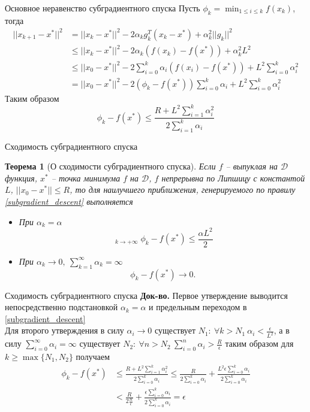 \documentclass[10pt, handout]{beamer}
\DeclareMathOperator*\uplim{\overline{lim}}
\newtheorem{theorem_ru}{Теорема}[]
\begin{document}
\begin{frame}{Основное неравенство субградиентного спуска}
Пусть $\phi_k=\min_{1\leq i\leq k}f(x_k)$, тогда
\begin{align*} 
||x_{k+1}-x^*||^2&=||x_k-x^*||^2-2\alpha_kg^T_k(x_k-x^*)+\alpha_k^2||g_k||^2\\
&\leq||x_k-x^*||^2-2\alpha_k(f(x_k)-f(x^*))+\alpha_k^2L^2\\
&\leq ||x_0-x^*||^2-2\sum_{i=0}^k\alpha_i(f(x_i)-f(x^*))+L^2\sum_{i=0}^k\alpha_i^2\\
&=||x_0-x^*||^2-2(\phi_k-f(x^*))\sum_{i=0}^k\alpha_i+L^2\sum_{i=0}^k\alpha_i^2
\end{align*}
Таким образом
\begin{equation}\label{lower_linear_model}
\phi_k-f(x^*)\leq \frac{R+L^2\sum_{i=1}^k\alpha_i^2}{2\sum_{i=1}^k\alpha_i}
\end{equation}
\end{frame}

\begin{frame}{Сходимость субградиентного спуска}
\begin{theorem_ru}[О сходимости субградиентного спуска]
Если $f$ -- выпуклая на $\mathcal{D}$ функция, $x^*$ -- точка минимума $f$ на $\mathcal{D}$, $f$ непрерывна по Липшицу с константой $L$, $||x_0-x^*||\leq R$, то для наилучшего приближения, генерируемого по правилу \eqref{subgradient_descent} выполняется
\begin{itemize}
\item При $\alpha_k=\alpha$
$$
\uplim_{k\rightarrow +\infty}\phi_k-f(x^*)\leq \frac{\alpha L^2}{2}
$$
\item При $\alpha_k\rightarrow 0,~\sum_{k=1}^\infty \alpha_k=\infty$
$$
\phi_k-f(x^*)\rightarrow 0.
$$
\end{itemize}
\end{theorem_ru}

\end{frame}

\begin{frame}{Сходимость субградиентного спуска}
\textbf{Док-во.} Первое утверждение выводится непосредственно подстановкой $\alpha_k=\alpha$ и предельным переходом в \eqref{subgradient_descent}\\
\pause
\vspace{1em}
Для второго утверждения в силу $\alpha_i\rightarrow 0$ существует $N_1:~\forall k>N_1~\alpha_i<\frac{\epsilon}{L^2}$, а в силу $\sum_{i=0}^\infty \alpha_i=\infty$ существует $N_2:~\forall n>N_2~\sum_{i=0}^n\alpha_i>\frac{R}{\epsilon}$ таким образом для $k\geq \max\{N_1, N_2\}$ получаем
\begin{align*}
\phi_k-f(x^*)&\leq \frac{R+L^2\sum_{i=1}^k\alpha_i^2}{2\sum_{i=0}^k\alpha_i}\leq \frac{R}{2\sum_{i=0}^k\alpha_i}+\frac{L^2\epsilon \sum_{i=0}^k\alpha_i}{2\sum_{i=0}^k\alpha_i}\\
&< \frac{R}{2\frac{R}{\epsilon}}+\frac{\epsilon\sum_{i=0}^k\alpha_i}{2\sum_{i=0}^k\alpha_i}=\epsilon 
\end{align*}

\end{frame}
\end{document}

